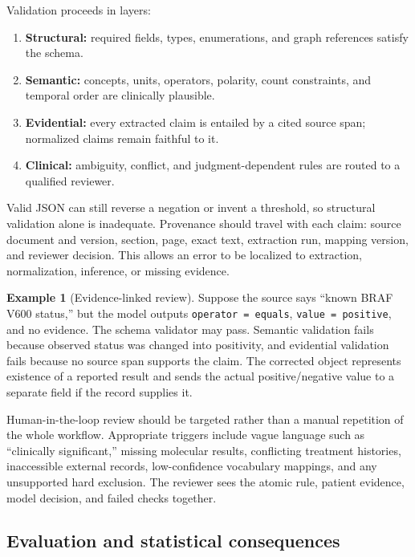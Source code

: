 \documentclass[12pt,oneside]{book}
\numberwithin{equation}{section}
\theoremstyle{definition}
\newtheorem{example}{Example}[section]
\theoremstyle{plain}
\theoremstyle{remark}
\begin{document}
Validation proceeds in layers:
\begin{enumerate}
    \item \textbf{Structural:} required fields, types, enumerations, and graph
    references satisfy the schema.
    \item \textbf{Semantic:} concepts, units, operators, polarity, count
    constraints, and temporal order are clinically plausible.
    \item \textbf{Evidential:} every extracted claim is entailed by a cited
    source span; normalized claims remain faithful to it.
    \item \textbf{Clinical:} ambiguity, conflict, and judgment-dependent rules
    are routed to a qualified reviewer.
\end{enumerate}
Valid JSON can still reverse a negation or invent a threshold, so structural
validation alone is inadequate.  Provenance should travel with each claim:
source document and version, section, page, exact text, extraction run, mapping
version, and reviewer decision.  This allows an error to be localized to
extraction, normalization, inference, or missing evidence.

\begin{example}[Evidence-linked review]
Suppose the source says ``known BRAF V600 status,'' but the model outputs
\texttt{operator = equals}, \texttt{value = positive}, and no evidence.  The
schema validator may pass.  Semantic validation fails because observed status
was changed into positivity, and evidential validation fails because no source
span supports the claim.  The corrected object represents existence of a
reported result and sends the actual positive/negative value to a separate
field if the record supplies it.
\end{example}

Human-in-the-loop review should be targeted rather than a manual repetition of
the whole workflow.  Appropriate triggers include vague language such as
``clinically significant,'' missing molecular results, conflicting treatment
histories, inaccessible external records, low-confidence vocabulary mappings,
and any unsupported hard exclusion.  The reviewer sees the atomic rule,
patient evidence, model decision, and failed checks together.

\subsection{Evaluation and statistical consequences}
\end{document}
